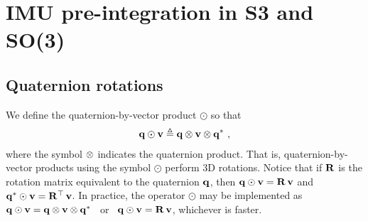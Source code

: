 

\newcommand{\bw}{{\bfomega}}
\newcommand{\bth}{{\bftheta}}
\newcommand{\bphi}{{\bfphi}}
\newcommand{\nth}{\norm{\bth}}
\newcommand{\ab}{{\bfa_b}}
\newcommand{\wb}{{\bw_b}}
\newcommand{\D}{\Delta}
\newcommand{\Dzero}{{\D^0}}
\newcommand{\Dp}{{\D\bfp}}
\newcommand{\Dv}{{\D\bfv}}
\newcommand{\Dth}{{\D\bth}}
\newcommand{\Dq}{{\D\bfq}}
\newcommand{\DR}{{\D\bfR}}
\newcommand{\DP}{{\D\bfP}}
\newcommand{\DV}{{\D\bfV}}
\newcommand{\DTH}{{\D\bfTheta}}
\newcommand{\Dw}{{\D\bw}}
\newcommand{\DW}{{\D\bfOmega}}
\newcommand{\dpp}{{\delta\bfp}}
\newcommand{\dv}{{\delta\bfv}}
\newcommand{\dth}{{\delta\bth}}
\newcommand{\dq}{{\delta\bfq}}
\newcommand{\dR}{{\delta\bfR}}
\newcommand{\dP}{{\delta\bfP}}
\newcommand{\dV}{{\delta\bfV}}
\newcommand{\dTH}{{\delta\bfTheta}}
\newcommand{\dw}{{\delta\bw}}

\newcommand{\te}{\triangleq}
\newcommand{\od}{\odot}

\newcommand{\tcom}[1]{{\footnotesize/\texttt{#1}/} }
\newcommand{\com}[1]{{\footnotesize/\texttt{#1}/~} }
\newcommand{\cdef}{\com{def}}
\newcommand{\cchain}{\com{chain}}
\newcommand{\ccross}{\com{cross}}
\newcommand{\cJr}{\com{Jr}}
\newcommand{\csmall}{\com{small}}
\newcommand{\cswap}{\com{swap}}
\newcommand{\ctrans}{\com{trans}}
\newcommand{\clog}{\com{Log}}
\newcommand{\clim}{\com{lim}}
\newcommand{\ccancel}{\com{cancel}}
\newcommand{\cexpand}{\com{expand}}
\newcommand{\csubst}{\com{subst}}

\section{IMU pre-integration in S3 and SO(3)}


\subsection{Quaternion rotations}

We define the quaternion-by-vector product $\od$ so that
%
\begin{align}
\bfq\od\bfv \te \bfq\ot\bfv\ot\bfq^*
~,
\end{align}
%
where the symbol $\otimes$ indicates the quaternion product.
That is, quaternion-by-vector products using the symbol $\od$ perform 3D rotations. 
Notice that if ${\bf R}$ is the rotation matrix equivalent to the quaternion ${\bf q}$, then $\bfq\od\bfv = \bfR\,\bfv$ and $\bfq^*\od\bfv = \bfR\tr\,\bfv$. 
In practice, the operator $\od$ may be implemented as ~$\bfq\od\bfv = \bfq\ot\bfv\ot\bfq^*$ ~or~ $\bfq\od\bfv = \bfR\,\bfv$, whichever is faster.


